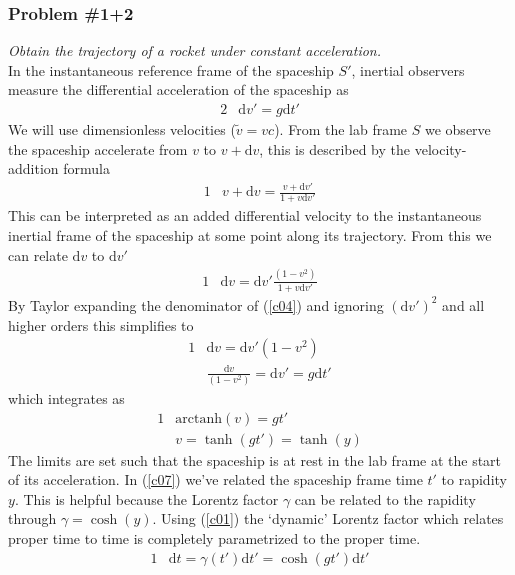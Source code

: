 \documentclass[]{article}
\numberwithin{equation}{subsection}
\begin{document}
\subsubsection*{Problem \#1+2}
\emph{Obtain the trajectory of a rocket under constant acceleration.}\\

\noindent In the instantaneous reference frame of the spaceship $S'$, inertial observers measure the differential acceleration of the spaceship as
\begin{alignat}{2}
	\label{c01}	&\mathrm{d}v'=g\mathrm{d}t'
\end{alignat}
We will use dimensionless velocities ($\tilde{v}=vc$). From the lab frame $S$ we observe the spaceship accelerate from $v$ to $v+\mathrm{d}v$, this is described by the velocity-addition formula
\begin{alignat}{1}
	\label{c02}	&v+\mathrm{d}v=\frac{v+\mathrm{d}v'}{1+v\mathrm{d}v'}
\end{alignat}
This can be interpreted as an added differential velocity to the instantaneous inertial frame of the spaceship at some point along its trajectory. From this we can relate $\mathrm{d}v$ to $\mathrm{d}v'$
\begin{alignat}{1}
	\label{c03}	&\mathrm{d}v=\mathrm{d}v'\frac{(1-v^{2})}{1+v\mathrm{d}v'}
\end{alignat}
By Taylor expanding the denominator of (\ref{c04}) and ignoring $(\mathrm{d}v')^{2}$ and all higher orders this simplifies to
\begin{alignat}{1}
	\label{c04}	&\mathrm{d}v=\mathrm{d}v'(1-v^{2})\\
	\label{c05}	&\frac{\mathrm{d}v}{(1-v^{2})}=\mathrm{d}v'=g\mathrm{d}t'
\end{alignat}
which integrates as
\begin{alignat}{1}
	\label{c06}	&\mathrm{arctanh}(v)=gt'\\
	\label{c07}	&v=\tanh(gt')=\tanh(y)
\end{alignat}
The limits are set such that the spaceship is at rest in the lab frame at the start of its acceleration. In (\ref{c07}) we've related the spaceship frame time $t'$ to rapidity $y$. This is helpful because the Lorentz factor $\gamma$ can be related to the rapidity through $\gamma=\cosh(y)$. Using  (\ref{c01}) the `dynamic' Lorentz factor which relates proper time to time is completely parametrized to the proper time.
\begin{alignat}{1}
	\label{c08}	&\mathrm{d}t=\gamma(t')\mathrm{d}t'=\cosh(gt')\mathrm{d}t'
\end{alignat}
\end{document}
